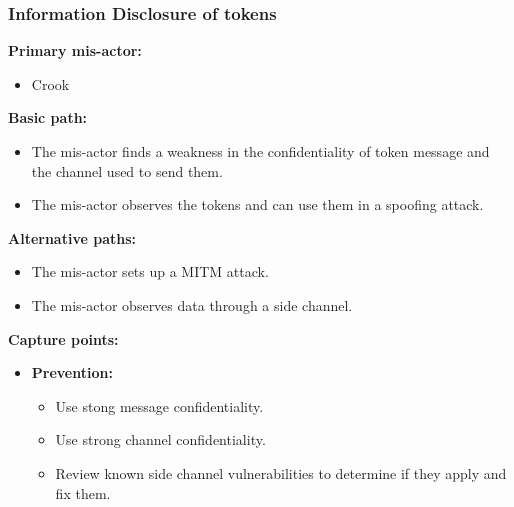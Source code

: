 \documentclass[a4paper,11pt]{report}
\begin{document}
\subsubsection{Information Disclosure of tokens}
\label{PlayerFlowCasesI2}
\textbf{Primary mis-actor:}
\begin{itemize}
\item Crook
\end{itemize}
\textbf{Basic path:}
\begin{itemize}
\item The mis-actor finds a weakness in the confidentiality of token message and the channel used to send them.
\item The mis-actor observes the tokens and can use them in a spoofing attack.
\end{itemize}
\textbf{Alternative paths:}
\begin{itemize}
\item The mis-actor sets up a MITM attack.
\item The mis-actor observes data through a side channel.
\end{itemize}
\textbf{Capture points:}
\begin{itemize}
\item \textbf{Prevention:}
\begin{itemize}
\item Use stong message confidentiality.
\item Use strong channel confidentiality.
\item Review known side channel vulnerabilities to determine if they apply and fix them.
\end{itemize}
\end{itemize}
\end{document}
